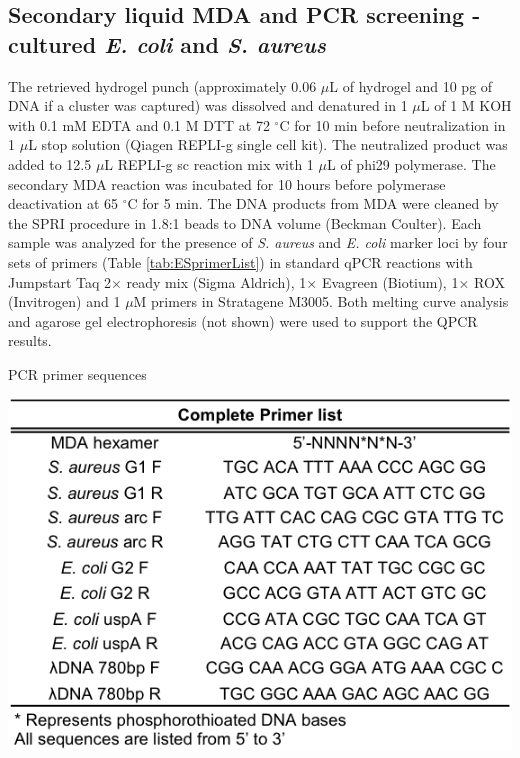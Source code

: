 \subsection{Secondary liquid MDA and PCR screening - cultured \textit{E. coli} and \textit{S. aureus}}
The retrieved hydrogel punch (approximately 0.06 $\mu$L of hydrogel and 10 pg of DNA if a cluster was captured) was dissolved and denatured in 1 $\mu$L of 1 M KOH with 0.1 mM EDTA and 0.1 M DTT at 72 $^{\circ}$C for 10 min before neutralization in 1 $\mu$L stop solution (Qiagen REPLI-g single cell kit). The neutralized product was added to 12.5 $\mu$L REPLI-g sc reaction mix with 1 $\mu$L of phi29 polymerase. The secondary MDA reaction was incubated for 10 hours before polymerase deactivation at 65 $^{\circ}$C for 5 min. The DNA products from MDA were cleaned by the SPRI procedure in 1.8:1 beads to DNA volume (Beckman Coulter). Each sample was analyzed for the presence of \textit{S. aureus} and \textit{E. coli} marker loci by four sets of primers (Table \ref{tab:ESprimerList}) in standard qPCR reactions with Jumpstart Taq 2$\times$ ready mix (Sigma Aldrich), 1$\times$ Evagreen (Biotium), 1$\times$ ROX (Invitrogen) and 1 $\mu$M primers in Stratagene M3005. Both melting curve analysis and agarose gel electrophoresis (not shown) were used to support the QPCR results.

\begin{table}
\caption{PCR primer sequences}
\label{tab:ESprimerList}
\begin{center}
\includegraphics[width=0.5\linewidth]{./figures/ESprimerList}
\end{center}
\end{table}

